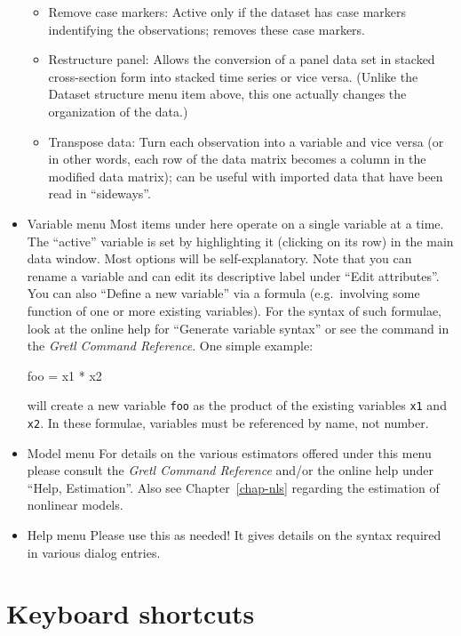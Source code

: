\begin{itemize}
\begin{itemize}
  \item \textsf{Remove case markers}: Active only if the dataset has
    case markers indentifying the observations; removes these case
    markers.
  \item \textsf{Restructure panel}: Allows the conversion of a panel
    data set in stacked cross-section form into stacked time series or
    vice versa.  (Unlike the \textsf{Dataset structure} menu item
    above, this one actually changes the organization of the data.)
  \item \textsf{Transpose data}: Turn each observation into a variable
    and vice versa (or in other words, each row of the data matrix
    becomes a column in the modified data matrix); can be useful with
    imported data that have been read in ``sideways''.
  \end{itemize}

\item \textsf{Variable menu} Most items under here operate on a single
  variable at a time.  The ``active'' variable is set by highlighting
  it (clicking on its row) in the main data window.  Most options will
  be self-explanatory.  Note that you can rename a variable and can
  edit its descriptive label under ``Edit attributes''. You can also
  ``Define a new variable'' via a formula (e.g.\ involving some
  function of one or more existing variables). For the syntax of such
  formulae, look at the online help for ``Generate variable syntax''
  or see the  command in the \emph{Gretl Command Reference}.
  One simple example:
          
\begin{code} 
    foo = x1 * x2
\end{code}

  will create a new variable \verb+foo+ as the product of the existing
  variables \verb+x1+ and \verb+x2+.  In these formulae, variables
  must be referenced by name, not number.
\item \textsf{Model menu} For details on the various estimators
  offered under this menu please consult the \emph{Gretl Command
    Reference} and/or the online help under ``Help, Estimation''.
  Also see Chapter~\ref{chap-nls} regarding the estimation of nonlinear
  models.
\item \textsf{Help menu} Please use this as needed! It gives details
  on the syntax required in various dialog entries.
\end{itemize}

\section{Keyboard shortcuts}
\label{keyb-accel}

